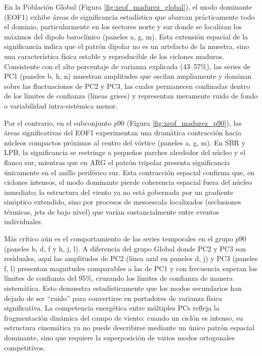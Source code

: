 En la Población Global (Figura \ref{fig:xeof_madurez_global}), el modo dominante (EOF1) exhibe áreas de significancia estadística que abarcan prácticamente todo el dominio, particularmente en los sectores norte y sur donde se localizan los máximos del dipolo baroclínico (paneles a, g, m). 
Esta extensión espacial de la significancia indica que el patrón dipolar no es un artefacto de la muestra, sino una característica física estable y reproducible de los ciclones maduros. 
Consistente con el alto porcentaje de varianza explicada (43--57\%), las series de PC1 (paneles b, h, n) muestran amplitudes que oscilan ampliamente y dominan sobre las fluctuaciones de PC2 y PC3, las cuales permanecen confinadas dentro de los límites de confianza (líneas grises) y representan meramente ruido de fondo o variabilidad intra-sistémica menor.

Por el contrario, en el subconjunto $p90$ (Figura \ref{fig:xeof_madurez_p90}), las áreas significativas del EOF1 experimentan una dramática contracción hacia núcleos compactos próximos al centro del vórtice (paneles a, g, m). 
En SBR y LPB, la significancia se restringe a pequeños parches alrededor del núcleo y el flanco sur, mientras que en ARG el patrón tripolar presenta significancia únicamente en el anillo periférico sur. 
Esta contracción espacial confirma que, en ciclones intensos, el modo dominante pierde coherencia espacial fuera del núcleo inmediato; la estructura del viento ya no está gobernada por un gradiente sinóptico extendido, sino por procesos de mesoescala localizados (seclusiones térmicas, jets de bajo nivel) que varían sustancialmente entre eventos individuales.

Más crítico aún es el comportamiento de las series temporales en el grupo $p90$ (paneles b, d, f y h, j, l). A diferencia del grupo Global donde PC2 y PC3 son residuales, aquí las amplitudes de PC2 (línea azul en paneles d, j) y PC3 (paneles f, l) presentan magnitudes comparables a las de PC1 y con frecuencia superan los límites de confianza del 95\%, cruzando los límites de confianza de manera sistemática. 
Esto demuestra estadísticamente que los modos secundarios han dejado de ser ``ruido'' para convertirse en portadores de varianza física significativa. 
La competencia energética entre múltiples PCs refleja la fragmentación dinámica del campo de viento: cuando un ciclón es intenso, su estructura cinemática ya no puede describirse mediante un único patrón espacial dominante, sino que requiere la superposición de varios modos ortogonales competitivos.

